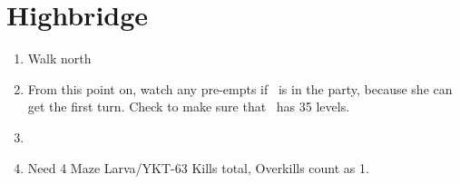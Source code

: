 \chapter{Highbridge}
\begin{spheregrid}
    \begin{itemize}
        \yunaf
    \end{itemize}
\end{spheregrid}
\begin{enumerate}
    \item Walk north
    \item From this point on, watch any pre-empts if \yuna\ is in the party, because she can get the first turn. Check to make sure that \lulu\ has 35 levels.
    \item \formation{\tidus}{\yuna}{\wakka}
    \item Need 4 Maze Larva/YKT-63 Kills total, Overkills count as 1.
\end{enumerate}
